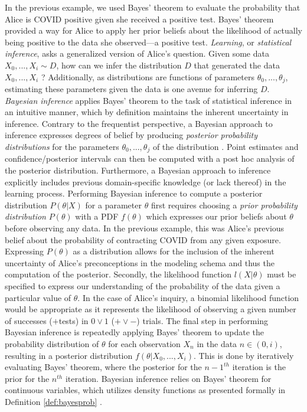 \documentclass[
  12pt,
  oneside]{book}
\theoremstyle{definition}
\theoremstyle{definition}
\theoremstyle{definition}
\theoremstyle{remark}
\begin{document}
In the previous example, we used Bayes' theorem to evaluate the probability that Alice is COVID positive given she received a positive test.
Bayes' theorem provided a way for Alice to apply her prior beliefs about the likelihood of actually being positive to the data she observed---a positive test.
\emph{Learning}, or \emph{statistical inference}, asks a generalized version of Alice's question.
Given some data \(X_0,...,X_i \sim D\), how can we infer the distribution \(D\) that generated the data \(X_0,...,X_i\) \citep[  6.1]{Wasserman2004}?
Additionally, as distributions are functions of parameters \(\theta_0, ..., \theta_j\), estimating these parameters given the data is one avenue for inferring \(D\).
\emph{Bayesian inference} applies Bayes' theorem to the task of statistical inference in an intuitive manner, which by definition maintains the inherent uncertainty in inference.
Contrary to the frequentist perspective, a Bayesian approach to inference expresses degrees of belief by producing \emph{posterior probability distributions} for the parameters \(\theta_0, ..., \theta_j\) of the distribution \citep[  11.1]{Wasserman2004}.
Point estimates and confidence/posterior intervals can then be computed with a post hoc analysis of the posterior distribution.
Furthermore, a Bayesian approach to inference explicitly includes previous domain-specific knowledge (or lack thereof) in the learning process.
Performing Bayesian inference to compute a posterior distribution \(P(\theta|X)\) for a parameter \(\theta\) first requires choosing a \emph{prior probability distribution} \(P(\theta)\) with a PDF \(f(\theta)\) which expresses our prior beliefs about \(\theta\) before observing any data.
In the previous example, this was Alice's previous belief about the probability of contracting COVID from any given exposure.
Expressing \(P(\theta)\) as a distribution allows for the inclusion of the inherent uncertainty of Alice's preconceptions in the modeling schema and thus the computation of the posterior.
Secondly, the likelihood function \(l(X|\theta)\) must be specified to express our understanding of the probability of the data given a particular value of \(\theta\).
In the case of Alice's inquiry, a binomial likelihood function would be appropriate as it represents the likelihood of observing a given number of successes (\(+\)tests) in \(0 \lor 1\) (\(+ \lor -\)) trials.
The final step in performing Bayesian inference is repeatedly applying Bayes' theorem to update the probability distribution of \(\theta\) for each observation \(X_n\) in the data \(n \in (0,i)\), resulting in a posterior distribution \(f(\theta|X_0,...,X_i)\).
This is done by iteratively evaluating Bayes' theorem, where the posterior for the \(n-1^{th}\) iteration is the prior for the \(n^{th}\) iteration.
Bayesian inference relies on Bayes' theorem for continuous variables, which utilizes density functions as presented formally in Definition \ref{def:bayesprob} \citep{Junker2003}.
\end{document}

